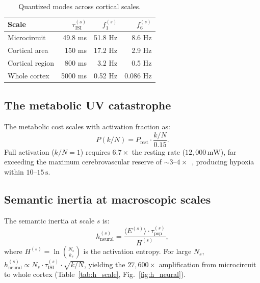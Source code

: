 \documentclass[aps,pre,twocolumn,showpacs,superscriptaddress,longbibliography]{revtex4-2}
\newcommand{\kN}{k/N}
\newcommand{\taupop}{\tau_{\mathrm{pop}}}
\newcommand{\tauISI}{\tau_{\mathrm{ISI}}}
\newcommand{\hneu}{h_{\mathrm{neural}}}
\begin{document}
\begin{table}[h]
\caption{\label{tab:hierarchy}Quantized modes across cortical scales.}
\begin{ruledtabular}
\begin{tabular}{lrrr}
Scale & $\tauISI^{(s)}$ & $f_1^{(s)}$ & $f_6^{(s)}$ \\
\hline
Microcircuit    &  49.8 ms &  51.8 Hz &  8.6 Hz \\
Cortical area   & 150   ms &  17.2 Hz &  2.9 Hz \\
Cortical region & 800   ms &   3.2 Hz &  0.5 Hz \\
Whole cortex    & 5000  ms &   0.52 Hz & 0.086 Hz \\
\end{tabular}
\end{ruledtabular}
\end{table}

\subsection{The metabolic UV catastrophe}

The metabolic cost scales with activation fraction as:
\begin{equation}
  P(\kN) = P_{\mathrm{rest}} \cdot \frac{\kN}{0.15}.
  \label{eq:power}
\end{equation}
Full activation ($\kN = 1$) requires $6.7\times$ the resting
rate ($12{,}000\,\mathrm{mW}$), far exceeding the maximum
cerebrovascular reserve of $\sim 3$--$4\times$~\cite{Buzsaki2007},
producing hypoxia within $10$--$15\,\mathrm{s}$.

\subsection{Semantic inertia at macroscopic scales}

The semantic inertia at scale $s$ is:
\begin{equation}
  \hneu^{(s)} = \frac{\langle E^{(s)}\rangle \cdot \taupop^{(s)}}
                      {H^{(s)}},
  \label{eq:h_scale}
\end{equation}
where $H^{(s)} = \ln\binom{N_s}{k_s}$ is the activation entropy.
For large $N_s$, $\hneu^{(s)} \propto N_s \cdot \tauISI^{(s)}
\cdot \sqrt{\kN}$, yielding the $27{,}600\times$ amplification
from microcircuit to whole cortex (Table~\ref{tab:h_scale},
Fig.~\ref{fig:h_neural}).

\end{document}
